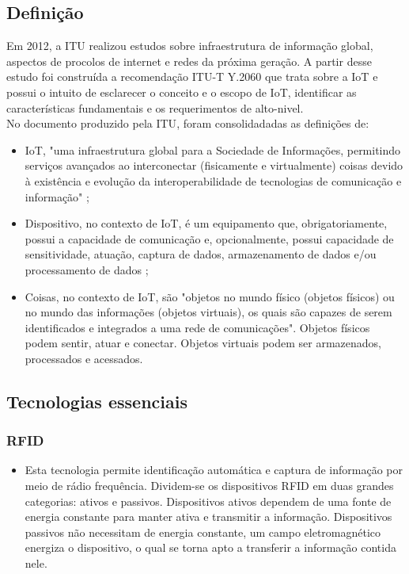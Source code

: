 \subsection{Definição}
	Em 2012, a \acrfull{ITU} realizou estudos sobre infraestrutura
	de informação global, aspectos de procolos de internet e redes da próxima geração.
	A partir desse estudo foi construída a recomendação ITU-T Y.2060 \cite{ITU} que trata sobre a \acrlong{IoT}
	e possui o intuito de esclarecer o conceito e o escopo de \acrshort{IoT}, identificar
	as características fundamentais e os requerimentos de alto-nivel.
\\	No documento produzido pela \acrshort{ITU}, foram consolidadadas as definições de:
	\begin{itemize}
		\item \acrlong{IoT}, "uma infraestrutura global para a Sociedade de Informações, permitindo serviços avançados ao
		interconectar (fisicamente e virtualmente) coisas devido à existência e evolução da interoperabilidade
	de tecnologias de comunicação e informação" \cite{ITU};
		\item Dispositivo, no contexto de \acrshort{IoT}, é um equipamento que, obrigatoriamente, possui a capacidade
		de comunicação e, opcionalmente, possui capacidade de sensitividade, atuação, captura de dados,
		armazenamento de dados e/ou processamento de dados \cite{ITU};
		\item Coisas, no contexto de \acrshort{IoT}, são "objetos
	no mundo físico (objetos físicos) ou no mundo das informações (objetos virtuais), os quais são capazes
	de serem identificados e integrados a uma rede de comunicações". Objetos físicos podem sentir, atuar e conectar.
	Objetos virtuais podem ser armazenados, processados e acessados.\cite{ITU}
	\end{itemize}
\subsection{Tecnologias essenciais}
	\subsubsection{\acrfull{RFID}}
		\begin{itemize}
			\item Esta tecnologia permite identificação automática e captura de informação por meio de rádio frequência.
			Dividem-se os dispositivos \acrshort{RFID} em duas grandes categorias: ativos e passivos. Dispositivos ativos dependem
			de uma fonte de energia constante para manter ativa e transmitir a informação. Dispositivos passivos não necessitam de energia constante,
			um campo eletromagnético energiza o dispositivo, o qual se torna apto a transferir a informação contida nele.
			\cite{refrfid}
		\end{itemize}
